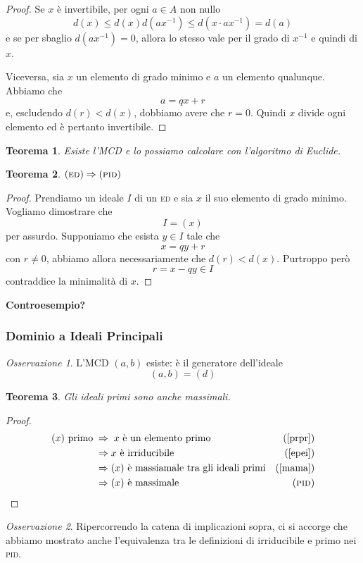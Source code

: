 \documentclass[a4paper]{article}
\newtheorem{theorem}{Teorema}[section]
\theoremstyle{remark}
\newtheorem*{remark}{Osservazione}
\theoremstyle{definition}
\begin{document}
\begin{multicols}{2}
\begin{proof}
	Se $ x $ è invertibile, per ogni $ a \in A $ non nullo
	\[ d(x) \leq d(x) d(ax^{-1}) \leq d(x \cdot ax^{-1}) = d(a) \]
	e se per sbaglio $ d(ax^{-1}) = 0 $, allora lo stesso vale per il grado di $ x^{-1} $ e quindi di $ x $.
	
	Viceversa, sia $ x $ un elemento di grado minimo e $ a $ un elemento qualunque. Abbiamo che
	\[ a = qx + r \]
	e, escludendo $ d(r) < d(x) $, dobbiamo avere che $ r = 0 $. Quindi $ x $ divide ogni elemento ed è pertanto invertibile. 
\end{proof}

\begin{theorem}
	Esiste l'MCD e lo possiamo calcolare con l'algoritmo di Euclide.
\end{theorem}
	
\begin{theorem}
	$ (\textsc{ed})\Rightarrow(\textsc{pid}) $
\end{theorem}
\begin{proof}
	Prendiamo un ideale $ I $ di un \textsc{ed} e sia $ x $ il suo elemento di grado minimo. Vogliamo dimostrare che 
	\[ I = (x) \]
	per assurdo. Supponiamo che esista $ y \in I $ tale che
	\[ x = qy + r \]
	con $ r \neq 0 $, abbiamo allora necessariamente che $ d(r) < d(x) $. Purtroppo però
	\[ r = x - qy \in I \]
	contraddice la minimalità di $ x $.
\end{proof}

\textbf{Controesempio?} 

\subsubsection{Dominio a Ideali Principali}
\begin{remark}
	L'MCD $ (a, b) $ esiste: è il generatore dell'ideale $$  (a, b) = (d)  $$
\end{remark}

\begin{theorem}
	Gli ideali primi sono anche massimali.
\end{theorem}
\begin{proof}
	\begin{align*}
		(x) \text{ primo} \;& \Rightarrow\; x \text{ è un elemento primo} & \text{(\ref{prpr})} \\
		& \Rightarrow x \text{ è irriducibile} &\text{(\ref{epei})} \\
		& \Rightarrow (x) \text{ è massiamale tra gli ideali primi} &\text{(\ref{mama})} \\
		& \Rightarrow (x) \text{ è massimale} &\text{(\textsc{pid})}
	\end{align*}
\end{proof}

\begin{remark}
	Ripercorrendo la catena di implicazioni sopra, ci si accorge che abbiamo mostrato anche l'equivalenza tra le definizioni di irriducibile e primo  nei \textsc{pid}.
\end{remark}

\end{multicols}







\end{document}
